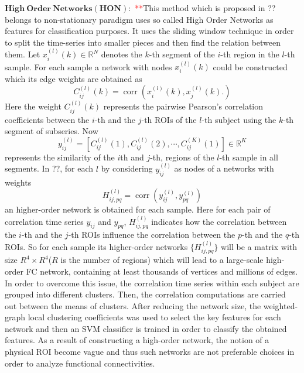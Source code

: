 \documentclass[preprint,12pt]{elsarticle}
\begin{document}
	$\mathbf{High~Order~Networks(HON):}$
	\textcolor{red}{**}This method which is proposed in ?? belongs to non-stationary paradigm uses so called
	High Order Networks as features for classification purposes. It uses the sliding window technique  in order to split the time-series into smaller pieces and then find the relation between them\cite{r51,r52}. Let $x_{i}^{(l)}(k) \in \mathbb{R}^N$ denotes the $k$-th segment
	of the $i$-th region in the $l$-th sample. For each sample a network with  nodes $x_{i}^{(l)}(k)$ could be constructed which its edge weights are obtained as
	\[
	C_{ij}^{(l)}(k) = \operatorname{corr}\left(x_{i}^{(l)}(k),x_{j}^{(l)}(k).
	\right)
	\]
	Here the weight $C_{ij}^{(l)}(k)$ represents the pairwise Pearson’s correlation coefficients
	between the $i$-th and the $j$-th ROIs of the $l$-th subject using the $k$-th segment of subseries. 
	Now
	\[
	y_{ij}^{(l)} = \left[ 
	C_{ij}^{(l)}(1), C_{ij}^{(l)}(2), \cdots , C_{ij}^{(K)}(1) 
	\right] \in \mathbb{R}^K
	\]
	represents the similarity of the $i$th and $j$-th, regions of the $l$-th sample in all segments. In ??, for each  $l$ by considering $y_{ij}^{(l)}$ as nodes of a networks with weights 
	\[
	H_{ij,pq}^{(l)} = \operatorname{corr} \left(
	y_{ij}^{(l)},y_{pq}^{(l)}
	\right)
	\]
	an higher-order network is obtained for each sample. Here 
	for each pair of correlation time series $y_{ij}$ and $y_{pq}$, $H_{ij,pq}^{(l)}$ indicates how the correlation between the $i$-th and the $j$-th ROIs influence the correlation between the $p$-th and the $q$-th ROIs. So for each sample its higher-order networks 
	$\{ H_{ij,pq}^{(l)} \}$ will be a matrix with size $R^4\times R^4$($R$ is the number of regions)
	which will lead to a large-scale high-order FC
	network, containing at least thousands of vertices and millions
	of edges. 
	In order to overcome this issue, the correlation time series within each subject are grouped into different clusters. Then, the correlation computations are carried out between the means of clusters. After reducing the network size, the
	weighted-graph local clustering coefficients was used to select the key features for each network and then an SVM classifier is trained in order to classify the obtained features. As a result of constructing a high-order network, the notion of a physical ROI become vague and thus such networks are not preferable choices in order to analyze functional connectivities. 
	
\end{document}

